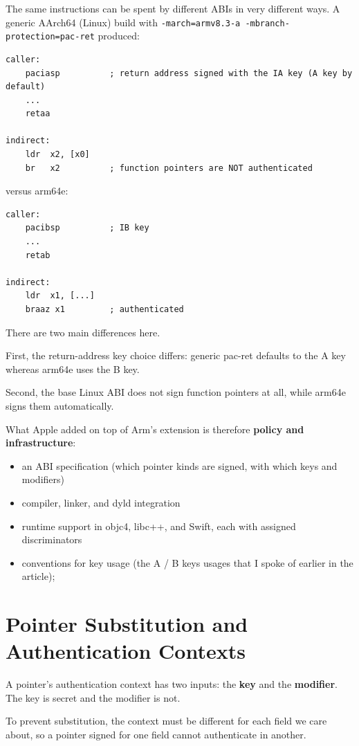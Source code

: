 The same instructions can be spent by different ABIs in very different ways. A generic AArch64 (Linux) build with \texttt{-march=armv8.3-a -mbranch-protection=pac-ret} produced:

\begin{verbatim}
caller:
    paciasp          ; return address signed with the IA key (A key by default)
    ...
    retaa

indirect:
    ldr  x2, [x0]
    br   x2          ; function pointers are NOT authenticated
\end{verbatim}

versus arm64e:

\begin{verbatim}
caller:
    pacibsp          ; IB key
    ...
    retab

indirect:
    ldr  x1, [...]
    braaz x1         ; authenticated
\end{verbatim}

There are two main differences here.

First, the return-address key choice differs: generic pac-ret defaults to the A key whereas arm64e uses the B key.

Second, the base Linux ABI does not sign function pointers at all, while arm64e signs them automatically.

What Apple added on top of Arm's extension is therefore \textbf{policy and infrastructure}:

\begin{itemize}
\item an ABI specification (which pointer kinds are signed, with which keys and modifiers)
\item compiler, linker, and dyld integration
\item runtime support in objc4, libc++, and Swift, each with assigned discriminators
\item conventions for key usage (the A / B keys usages that I spoke of earlier in the article);
\end{itemize}

\section{Pointer Substitution and Authentication Contexts}

A pointer's authentication context has two inputs: the \textbf{key} and the \textbf{modifier}. The key is secret and the modifier is not.

To prevent substitution, the context must be different for each field we care about, so a pointer signed for one field cannot authenticate in another.

